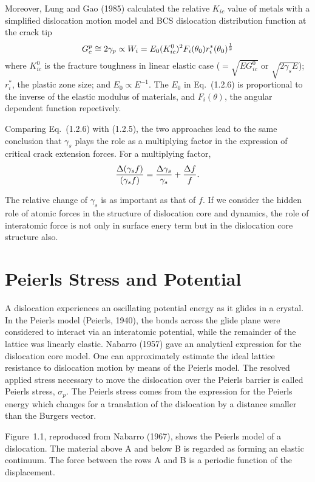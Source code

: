 Moreover, Lung and Gao (1985) calculated the relative $K_{ic}$ value 
of metals with a simplified dislocation motion model and BCS 
dislocation distribution function at the crack tip
\begin{equation}
G_c^p \cong 2 \gamma_p \propto W_i = E_0 (K_{ic}^0)^2 F_i 
(\theta_0) r_i^* (\theta_0)^{1\over2}
\end{equation}
where $K_{ic}^0$ is the fracture toughness in linear elastic case
($= \sqrt {E G_{ic}^0}$ or $\sqrt {2 \gamma_s E}$); ${r_i^*}$, the 
plastic zone size; and $E_0 \propto E^{-1}$. The $E_0$ in Eq.~(1.2.6) 
is proportional to the inverse of the elastic modulus of materials, 
and $F_i(\theta)$, the angular dependent function repectively.

Comparing Eq.~(1.2.6) with (1.2.5), the two approaches lead to 
the same conclusion that $\gamma_s$ plays the role as a multiplying 
factor in the expression of critical crack extension forces. For a 
multiplying factor,
\begin{equation}
{{\Delta (\gamma_s f)} \over {(\gamma_s f)}} = {{\Delta \gamma_s} 
\over {\gamma_s}} + {{\Delta f} \over f}.
\end{equation}

The relative change of $\gamma_s$ is as important as that of $f$.
If we consider the hidden role of atomic forces in the structure of 
dislocation core and dynamics, the role of interatomic force is not 
only in surface enery term but in the dislocation core structure also.

\section{Peierls Stress and Potential}  %
A dislocation  experiences an oscillating potential energy as it 
glides in a crystal. In the Peierls model (Peierls, 1940), the bonds 
across the glide plane were considered to interact via an interatomic 
potential, while the remainder of the lattice was linearly elastic. 
Nabarro (1957) gave an analytical expression for the dislocation core 
model. One can approximately estimate the ideal lattice resistance 
to dislocation motion by means of the Peierls model. The resolved 
applied stress necessary to move the dislocation over the Peierls 
barrier is called Peierls stress, $\sigma_p$. The Peierls stress comes 
from the expression for the Peierls energy which changes for a 
translation of the dislocation by a distance smaller than the Burgers 
vector.

Figure~1.1, reproduced from Nabarro (1967), shows the Peierls model of 
a dislocation. The material above A and below B is regarded as forming 
an elastic continuum. The force between the rows A and B is a periodic 
function of the displacement.

